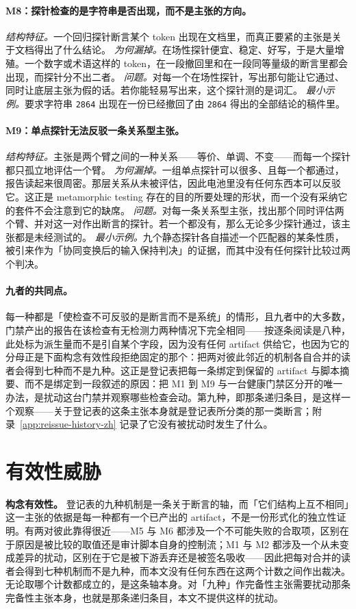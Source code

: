 \documentclass[UTF8,11pt]{ctexart}
\begin{document}
\paragraph{M8：探针检查的是字符串是否出现，而不是主张的方向。}
\emph{结构特征。}一个回归探针断言某个 token 出现在文档里，而真正要紧的主张是关于文档得出了什么结论。
\emph{为何漏掉。}在场性探针便宜、稳定、好写，于是大量增殖。一个数字或术语这样的 token，在一段撤回里和在一段同等量级的断言里都会出现，而探针分不出二者。
\emph{问题。}对每一个在场性探针，写出那句能让它通过、同时让底层主张为假的话。若你能轻易写出来，这个探针测的是词汇。
\emph{最小示例。}要求字符串 \texttt{2864} 出现在一份已经撤回了由 \texttt{2864} 得出的全部结论的稿件里。

\paragraph{M9：单点探针无法反驳一条关系型主张。}
\emph{结构特征。}主张是两个臂之间的一种关系——等价、单调、不变——而每一个探针都只孤立地评估一个臂。
\emph{为何漏掉。}一组单点探针可以很多、且每一个都通过，报告读起来很周密。那层关系从未被评估，因此电池里没有任何东西本可以反驳它。这正是 metamorphic testing 存在的目的所要处理的形状，而一个没有采纳它的套件不会注意到它的缺席。
\emph{问题。}对每一条关系型主张，找出那个同时评估两个臂、并对这一对作出断言的探针。若一个都没有，那么无论多少探针通过，该主张都是未经测试的。
\emph{最小示例。}九个静态探针各自描述一个匹配器的某条性质，被引来作为「协同变换后的输入保持判决」的证据，而其中没有任何探针比较过两个判决。

\paragraph{九者的共同点。}每一种都是「使检查不可反驳的是断言而不是系统」的情形，且九者中的大多数，门禁产出的报告在该检查有无检测力两种情况下完全相同——按逐条阅读是八种，此处标为派生量而不是引自某个字段，因为没有任何 artifact 供给它，也因为它的分母正是下面构念有效性段拒绝固定的那个：把两对彼此邻近的机制各自合并的读者会得到七种而不是九种。这正是登记表把每一条绑定到保留的 artifact 与脚本摘要、而不是绑定到一段叙述的原因：把 M1 到 M9 与一台健康门禁区分开的唯一办法，是扰动这台门禁并观察哪些检查会动。第九种，即那条递归条目，是这样一个观察——关于登记表的这条主张本身就是登记表所分类的那一类断言；附录~\ref{app:reissue-history-zh} 记录了它没有被扰动时发生了什么。

\section*{有效性威胁}
\noindent\textbf{构念有效性。} 登记表的九种机制是一条关于断言的轴，而「它们结构上互不相同」这一主张的依据是每一种都有一个已产出的 artifact，不是一份形式化的独立性证明。有两对彼此靠得很近——M5 与 M6 都涉及一个不可能失败的合取项，区别在于原因是被比较的取值还是审计脚本自身的控制流；M1 与 M2 都涉及一个从未变成差异的扰动，区别在于它是被下游丢弃还是被签名吸收——因此把每对合并的读者会得到七种机制而不是九种，而本文没有任何东西在这两个计数之间作出裁决。无论取哪个计数都成立的，是这条轴本身。对「九种」作完备性主张需要扰动那条完备性主张本身，也就是那条递归条目，本文不提供这样的扰动。
\end{document}
